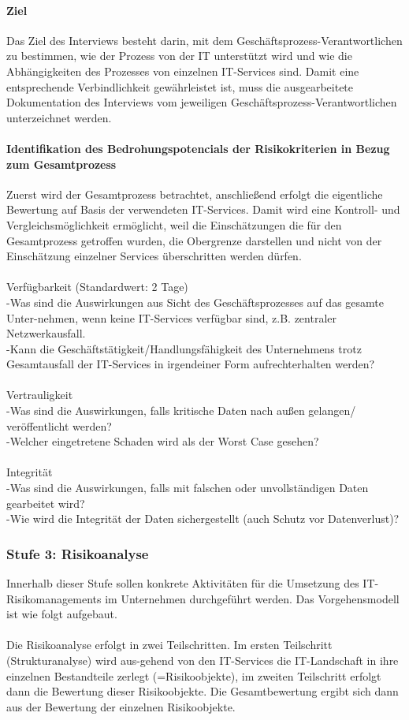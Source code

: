 \paragraph{Ziel}
Das Ziel des Interviews besteht darin, mit dem Geschäftsprozess-Verantwortlichen zu bestimmen, wie der Prozess von der IT unterstützt wird und wie die Abhängigkeiten des Prozesses von einzelnen IT-Services sind. Damit eine entsprechende Verbindlichkeit gewährleistet ist, muss die ausgearbeitete Dokumentation des Interviews vom jeweiligen Geschäftsprozess-Verantwortlichen unterzeichnet werden.

\paragraph{Identifikation des Bedrohungspotencials der Risikokriterien in Bezug zum Gesamtprozess}
Zuerst wird der Gesamtprozess betrachtet, anschließend erfolgt die eigentliche Bewertung auf Basis der verwendeten IT-Services. Damit wird eine Kontroll- und Vergleichsmöglichkeit ermöglicht, weil die Einschätzungen die für den Gesamtprozess getroffen wurden, die Obergrenze darstellen und nicht von der Einschätzung einzelner Services überschritten werden dürfen.\\
\\Verfügbarkeit (Standardwert: 2 Tage)
\\-Was sind die Auswirkungen aus Sicht des Geschäftsprozesses auf das gesamte Unter-nehmen, wenn keine IT-Services verfügbar sind, z.B. zentraler Netzwerkausfall.\\
-Kann die Geschäftstätigkeit/Handlungsfähigkeit des Unternehmens trotz Gesamtausfall der IT-Services in irgendeiner Form aufrechterhalten werden?\\
\\Vertrauligkeit
\\-Was sind die Auswirkungen, falls kritische Daten nach außen gelangen/ veröffentlicht werden?
\\-Welcher eingetretene Schaden wird als der Worst Case gesehen?\\
\\Integrität
\\-Was sind die Auswirkungen, falls mit falschen oder unvollständigen Daten gearbeitet wird?
\\-Wie wird die Integrität der Daten sichergestellt (auch Schutz vor Datenverlust)?
\subsubsection{Stufe 3: Risikoanalyse}
Innerhalb dieser Stufe sollen konkrete Aktivitäten für die Umsetzung des IT-Risikomanagements im Unternehmen durchgeführt werden. Das Vorgehensmodell ist wie folgt aufgebaut.\\
\\Die Risikoanalyse erfolgt in zwei Teilschritten. Im ersten Teilschritt (Strukturanalyse) wird aus-gehend von den IT-Services die IT-Landschaft in ihre einzelnen Bestandteile zerlegt (=Risikoobjekte), im zweiten Teilschritt erfolgt dann die Bewertung dieser Risikoobjekte. Die Gesamtbewertung ergibt sich dann aus der Bewertung der einzelnen Risikoobjekte.
